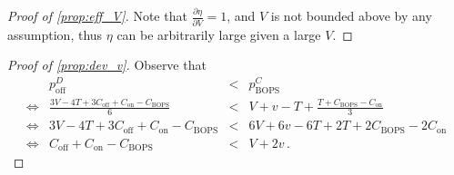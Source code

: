 \documentclass[a4paper]{article}
\theoremstyle{definition}
\theoremstyle{plain}
\theoremstyle{remark}
\newcommand{\on}{\mathrm{on}}
\newcommand{\off}{\mathrm{off}}
\newcommand{\BOPS}{\mathrm{BOPS}}
\begin{document}
\begin{proof}[Proof of \cref{prop:eff_V}]
    Note that $\frac{\partial \eta}{\partial V}=1$,
    and $V$ is not bounded above by any assumption,
    thus $\eta$ can be arbitrarily large given a large $V$.
\end{proof}

\begin{proof}[Proof of \cref{prop:dev_v}]
    Observe that
    \[
        \begin{array}{RRCL}
                 & p_{\off}^D                                  & < & p_{\BOPS}^C                         \\[3mm]
            \iff & \frac{3V-4T+3C_{\off}+C_{\on}-C_{\BOPS}}{6} & < & V+v-T+\frac{T+C_{\BOPS}-C_{\on}}{3} \\[3mm]
            \iff & 3V-4T+3C_{\off}+C_{\on}-C_{\BOPS}           & < & 6V+6v-6T+2T+2C_{\BOPS}-2C_{\on}     \\[3mm]
            \iff & C_{\off}+C_{\on}-C_{\BOPS}                  & < & V+2v\,.
        \end{array}
    \]
\end{proof}
\end{document}
